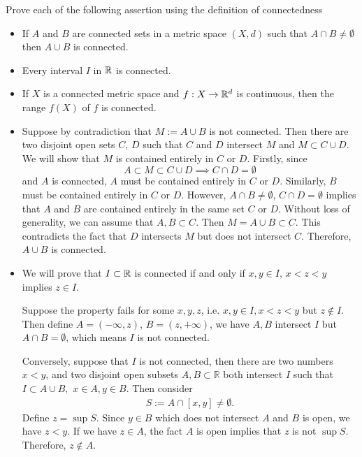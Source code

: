 \begin{problem}
Prove each of the following assertion using the definition of connectedness
\begin{itemize}
    \item[(a)] If $A$ and $B$ are connected sets in a metric space $(X,d)$ such that $A\cap B\ne \emptyset$ then $A\cup B$ is connected.
    \item[(b)] Every interval $I$ in $\mathbb{R}$ is connected.
    \item[(c)] If $X$ is a connected metric space and $f:X \to \mathbb{R}^d$ is continuous, then the range $f(X)$ of $f$ is connected.
\end{itemize}
\begin{solution}
\begin{itemize}
    \item[(a)]Suppose by contradiction that $M := A \cup B$ is not connected. Then there are two disjoint open sets $C$, $D$ such that $C$ and $D$ intersect $M$ and $M \subset C \cup D$.  We will show that $M$ is contained entirely in $C$ or $D$. Firstly, since
    $$ A \subset M \subset C \cup D \implies C \cap D = \emptyset$$ and $A$ is connected, $A$ must be contained entirely in $C$ or $D$. Similarly, $B$ must be contained entirely in $C$ or $D$. However, $A \cap B \ne \emptyset$, $C \cap D = \emptyset$ implies that $A$ and $B$ are contained entirely in the same set $C$ or $D$. Without loss of generality, we can assume that $A, B \subset C$. Then $M = A \cup B \subset C$. This contradicts the fact that $D$ intersects $M$ but does not intersect $C$. Therefore, $A \cup B$ is connected.
    \item[(b)] We will prove that $I \subset \mathbb{R}$ is connected if and only if $x, y \in I$, $x < z < y$ implies $ z \in I$. 
    
    Suppose the property fails for some $x,y,z$, i.e. $x, y \in I, x < z < y$ but $z \notin I$. Then define $A = (-\infty, z)$, $B = (z,+\infty)$, we have $A, B$ intersect $I$ but $A \cap B = \emptyset$, which means $I$ is not connected.
    
    Conversely, suppose that $I$ is not connected, then there are two numbers $x < y$, and two disjoint open subsets $A,B\subset \mathbb{R}$ both intersect $I$ such that $I\subset A\cup B,$ $x\in A,y\in B.$ Then consider \begin{align*}
        S:=A\cap [x,y]\ne \emptyset.
    \end{align*}
    Define $z=\sup S.$ Since $y\in B$ which does not intersect $A$ and $B$ is open, we have $z<y$. If we have $z\in A$, the fact $A$ is open implies that $z$ is not $\sup S.$ Therefore, $z\notin A.$
    

\end{itemize}
\end{solution}
\end{problem}
